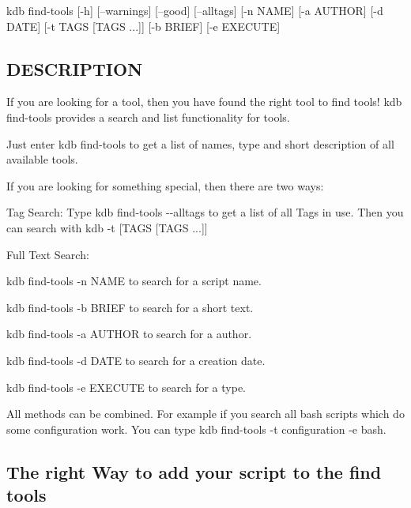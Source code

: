 {\ttfamily kdb find-\/tools} \mbox{[}-\/h\mbox{]} \mbox{[}--warnings\mbox{]} \mbox{[}--good\mbox{]} \mbox{[}--alltags\mbox{]} \mbox{[}-\/n N\+A\+M\+E\mbox{]} \mbox{[}-\/a A\+U\+T\+H\+O\+R\mbox{]} \mbox{[}-\/d D\+A\+T\+E\mbox{]} \mbox{[}-\/t T\+A\+G\+S \mbox{[}T\+A\+G\+S ...\mbox{]}\mbox{]} \mbox{[}-\/b B\+R\+I\+E\+F\mbox{]} \mbox{[}-\/e E\+X\+E\+C\+U\+T\+E\mbox{]}

\subsection*{D\+E\+S\+C\+R\+I\+P\+T\+I\+O\+N}

If you are looking for a tool, then you have found the right tool to find tools! {\ttfamily kdb find-\/tools} provides a search and list functionality for tools.

Just enter {\ttfamily kdb find-\/tools} to get a list of names, type and short description of all available tools.

If you are looking for something special, then there are two ways\+:


\begin{DoxyEnumerate}
\item Tag Search\+: Type {\ttfamily kdb find-\/tools -\/-\/alltags} to get a list of all Tags in use. Then you can search with {\ttfamily kdb -\/t \mbox{[}T\+A\+G\+S \mbox{[}T\+A\+G\+S ...\mbox{]}\mbox{]}}
\item Full Text Search\+:
\begin{DoxyItemize}
\item {\ttfamily kdb find-\/tools -\/n N\+A\+M\+E} to search for a script name.
\item {\ttfamily kdb find-\/tools -\/b B\+R\+I\+E\+F} to search for a short text.
\item {\ttfamily kdb find-\/tools -\/a A\+U\+T\+H\+O\+R} to search for a author.
\item {\ttfamily kdb find-\/tools -\/d D\+A\+T\+E} to search for a creation date.
\item {\ttfamily kdb find-\/tools -\/e E\+X\+E\+C\+U\+T\+E} to search for a type.
\end{DoxyItemize}
\end{DoxyEnumerate}

All methods can be combined. For example if you search all bash scripts which do some configuration work. You can type {\ttfamily kdb find-\/tools -\/t configuration -\/e bash}.

\subsection*{The right Way to add your script to the find tools}

